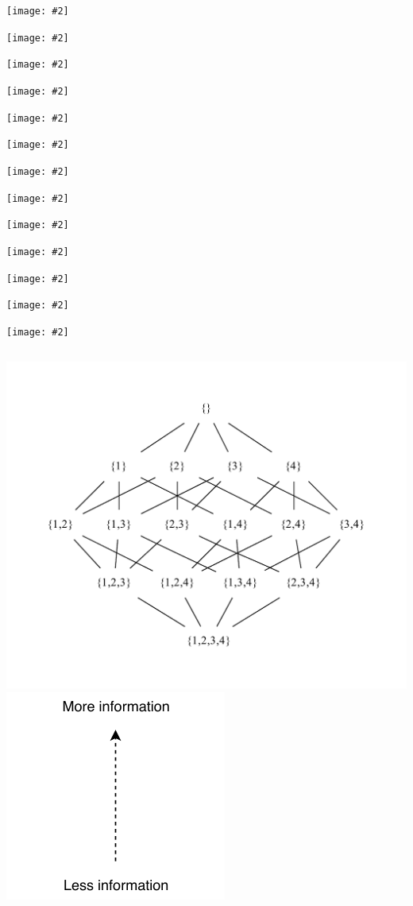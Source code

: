 \documentclass[UKenglish,usenames,dvipsnames,svgnames,table,aspectratio=169,mathserif]{beamer}
\newcommand{\imageslide}[2][1]{{
\begin{frame}\begin{center}
\texttt{[image: \#2]}
\end{center}\end{frame}
}}
\begin{document}
\imageslide[0.6]{sudoku/sudoku1.png}
\imageslide[0.6]{sudoku/sudoku2.png}
\imageslide[0.6]{sudoku/sudoku3.png}
\imageslide[0.6]{sudoku/sudoku4.png}
\imageslide[0.6]{sudoku/sudoku5.png}
\imageslide[0.6]{sudoku/sudoku6.png}
\imageslide[0.6]{sudoku/sudoku7.png}
\imageslide[0.6]{sudoku/sudoku8.png}
\imageslide[0.6]{sudoku/sudoku9.png}
\imageslide[0.6]{sudoku/sudoku10.png}
\imageslide[0.6]{sudoku/sudoku11.png}
\imageslide[0.6]{sudoku/sudoku12.png}
\imageslide[0.6]{sudoku/sudoku13.png}


\begin{frame}
\begin{columns}
\includegraphics[scale=0.65]{set/powerset.pdf}
\pause
{}
\includegraphics[scale=1.2]{set/more-info.pdf}
\end{columns}
\end{frame}
\end{document}
